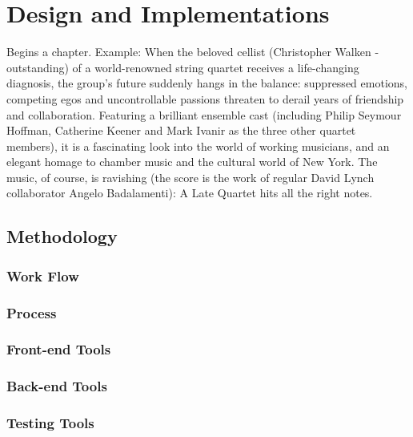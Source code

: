 %
%
\chapter{Design and Implementations}
\label{chap:D&I}

Begins a chapter. Example: When the beloved cellist (Christopher Walken - outstanding) of a world-renowned string quartet receives a life-changing diagnosis, the group's future suddenly hangs in the balance: suppressed emotions, competing egos and uncontrollable passions threaten to derail years of friendship and collaboration. Featuring a brilliant ensemble cast (including Philip Seymour Hoffman, Catherine Keener and Mark Ivanir as the three other quartet members), it is a fascinating look into the world of working musicians, and an elegant homage to chamber music and the cultural world of New York. The music, of course, is ravishing (the score is the work of regular David Lynch collaborator Angelo Badalamenti): A Late Quartet hits all the right notes.

\section{Methodology}
\label{sec:sec01}

\subsection{Work Flow}
\label{subsec:subsec01}

\subsection{Process}
\label{subsec:subsec02}

\subsection{Front-end Tools}
\label{subsec:FETools}


\subsection{Back-end Tools}
\label{subsec:subsec04}

\subsection{Testing Tools}
\label{subsec:subsec05}

